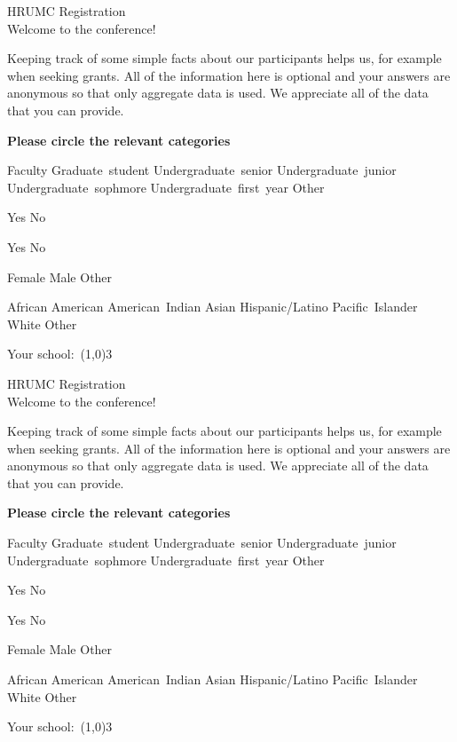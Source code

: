 \documentclass[12pt,oneside]{article}
\newcommand{\spacer}{\hspace{1.15em}}
\newcommand{\choice}[1]{\spacer\mbox{#1}}
\begin{document}
\thispagestyle{empty}
\newcommand{\body}{%
\RaggedRight
\begin{center} %
  \Large HRUMC Registration \\[0.5ex]
  \Large Welcome to the conference!
\end{center}

Keeping track of some simple facts about
our participants helps us, for example when seeking grants.
All of the information here is optional and
your answers are anonymous so that only aggregate data is used.
We appreciate all of the data that you can provide.

\vspace*{4ex}
\textbf{Please circle the relevant categories}
\begin{description}[font=\normalfont\itshape,
  labelsep=1em]
\item[Seniority:]
  Faculty
  \choice{Graduate student}
  \choice{Undergraduate senior}
  \choice{Undergraduate junior}
  \choice{Undergraduate sophmore}
  \choice{Undergraduate first year}
  \choice{Other}

\item[Attended HRUMC before?]
    Yes 
    \choice{No} 

\item[Attended any mathematics conference before?]
    Yes 
    \choice{No} 

\item[Gender:]
  Female
  \choice{Male}
  \choice{Other}

\item[Ethnicity:]
    African American 
    \choice{American Indian} 
    \choice{Asian} 
    \choice{Hispanic/Latino} 
    \choice{Pacific Islander}
    \choice{White}
    \choice{Other}

\item[Affiliation:]
  Your school:\ \line(1,0){3} 
\end{description}
}
\body
\par\vspace{1ex plus 1fill}
\body
\newpage
\newcommand{\comments}{%
\par\hspace*{-\leftmargin}\textit{\hspace*{1em} Additional comments:}} %
\end{document}
